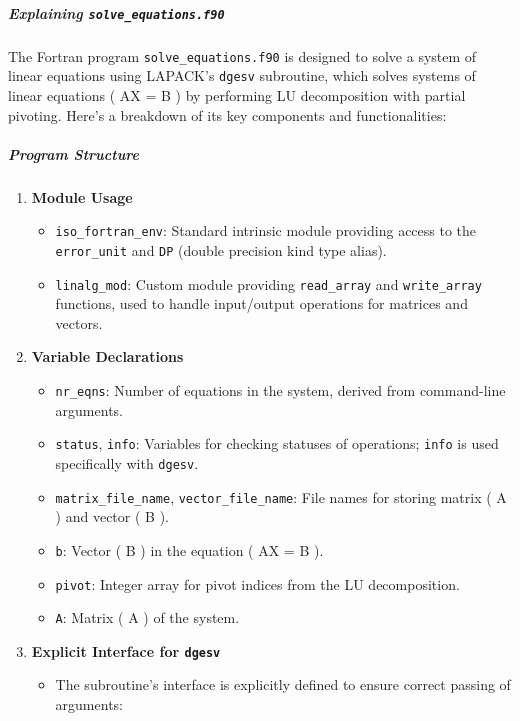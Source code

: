 \subparagraph{Explaining \texttt{solve\_equations.f90}}

The Fortran program \texttt{solve\_equations.f90} is designed to solve a system of linear equations using LAPACK's \texttt{dgesv} subroutine, which solves systems of linear equations ( AX = B ) by performing LU decomposition with partial pivoting. Here's a breakdown of its key components and functionalities:

\subparagraph{Program Structure}

\begin{enumerate}
\item \textbf{Module Usage}

\begin{itemize}
\item \texttt{iso\_fortran\_env}: Standard intrinsic module providing access to the \texttt{error\_unit} and \texttt{DP} (double precision kind type alias).
\item \texttt{linalg\_mod}: Custom module providing \texttt{read\_array} and \texttt{write\_array} functions, used to handle input/output operations for matrices and vectors.
\end{itemize}


\item \textbf{Variable Declarations}

\begin{itemize}
\item \texttt{nr\_eqns}: Number of equations in the system, derived from command-line arguments.
\item \texttt{status}, \texttt{info}: Variables for checking statuses of operations; \texttt{info} is used specifically with \texttt{dgesv}.
\item \texttt{matrix\_file\_name}, \texttt{vector\_file\_name}: File names for storing matrix ( A ) and vector ( B ).
\item \texttt{b}: Vector ( B ) in the equation ( AX = B ).
\item \texttt{pivot}: Integer array for pivot indices from the LU decomposition.
\item \texttt{A}: Matrix ( A ) of the system.
\end{itemize}


\item \textbf{Explicit Interface for \texttt{dgesv}}

\begin{itemize}
\item The subroutine's interface is explicitly defined to ensure correct passing of arguments:


\end{itemize}
\end{enumerate}
